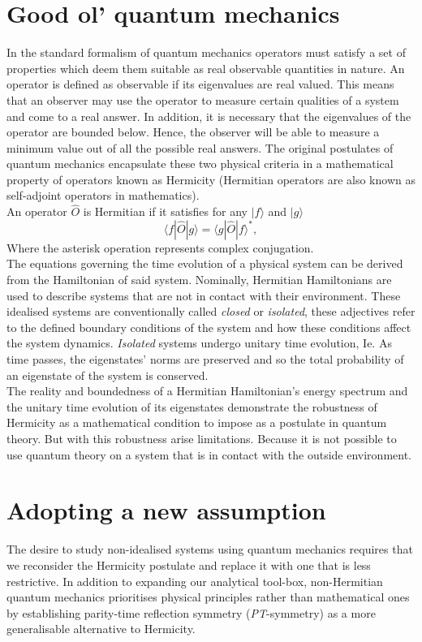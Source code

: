 \documentclass[10pt, a4paper, singlespacing, headsepline]{report}
\newcommand\PT{\emph{PT}}
\begin{document}
\section{Good ol' quantum mechanics}\label{QM}
In the standard formalism of quantum mechanics operators must satisfy a set of properties which deem them suitable as real observable quantities in nature.
An operator is defined as observable if its eigenvalues are real valued. This means that an observer may use the operator to measure certain qualities of a system and come to a real answer. In addition, it is  necessary that the eigenvalues of the operator are bounded below. Hence, the observer will be able to measure a minimum value out of all the possible real answers. 
The original postulates of quantum mechanics encapsulate these two physical criteria in a mathematical property of operators known as Hermicity (Hermitian operators are also known as self-adjoint operators in mathematics).\\
An operator $\hat{O}$ is Hermitian if it satisfies for any $|f \rangle$ and $|g\rangle$
\begin{equation} \label{eq:1}
\langle f|\widehat{O}|g\rangle = \langle g|\widehat{O}|f \rangle^{*},
\end{equation}  
Where the asterisk operation represents complex conjugation.\\
The equations governing the time evolution of a physical system can be derived from the Hamiltonian of said system\cite{BenderPT}. Nominally, Hermitian Hamiltonians are used to describe systems that are not in contact with their environment. These idealised systems are conventionally called \emph{closed} or \emph{isolated}, these adjectives refer to the defined boundary conditions of the system and how these conditions affect the system dynamics. \emph{Isolated} systems undergo unitary time evolution, Ie. As time passes, the eigenstates' norms are preserved and so the total probability of an eigenstate of the system is conserved. 
\\The reality and boundedness of a Hermitian Hamiltonian's energy spectrum and the unitary time evolution of its eigenstates demonstrate the robustness of Hermicity as a mathematical condition to impose as a postulate in quantum theory.
But with this robustness arise limitations. Because it is not possible to use quantum theory on a system that is in contact with the outside environment.

\section{Adopting a new assumption}\label{Assumptions}
The desire to study non-idealised systems using quantum mechanics requires that we reconsider the Hermicity postulate and replace it with one that is less restrictive.
In addition to expanding our analytical tool-box, non-Hermitian quantum mechanics prioritises physical principles rather than mathematical ones by establishing parity-time reflection symmetry (\PT-symmetry) as a more generalisable alternative to Hermicity.
 
\end{document}
